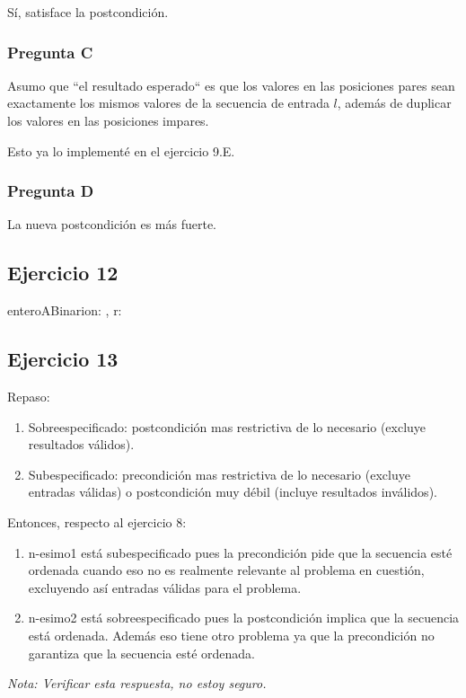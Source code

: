 Sí, satisface la postcondición.

\subsubsection{Pregunta C}

Asumo que ``el resultado esperado`` es que los valores en las posiciones pares sean exactamente los mismos valores de la secuencia de entrada $l$, además de duplicar los valores en las posiciones impares.

Esto ya lo implementé en el ejercicio 9.E.

\subsubsection{Pregunta D}

La nueva postcondición es más fuerte.

\subsection{Ejercicio 12}

\begin{proc}{enteroABinario}{\In n: \ent, \Out r: \TLista{\ent}}{}
\end{proc}

\subsection{Ejercicio 13}

Repaso:

\begin{enumerate}[1)]
    \item Sobreespecificado: postcondición mas restrictiva de lo necesario (excluye resultados válidos).
    \item Subespecificado: precondición mas restrictiva de lo necesario (excluye entradas válidas) o postcondición muy débil (incluye resultados inválidos).
\end{enumerate}

Entonces, respecto al ejercicio 8:

\begin{enumerate}[1)]
    \item n-esimo1 está subespecificado pues la precondición pide que la secuencia esté ordenada cuando eso no es realmente relevante al problema en cuestión, excluyendo así entradas válidas para el problema.
    \item n-esimo2 está sobreespecificado pues la postcondición implica que la secuencia está ordenada. Además eso tiene otro problema ya que la precondición no garantiza que la secuencia esté ordenada.
\end{enumerate}

{\em Nota: Verificar esta respuesta, no estoy seguro.}


